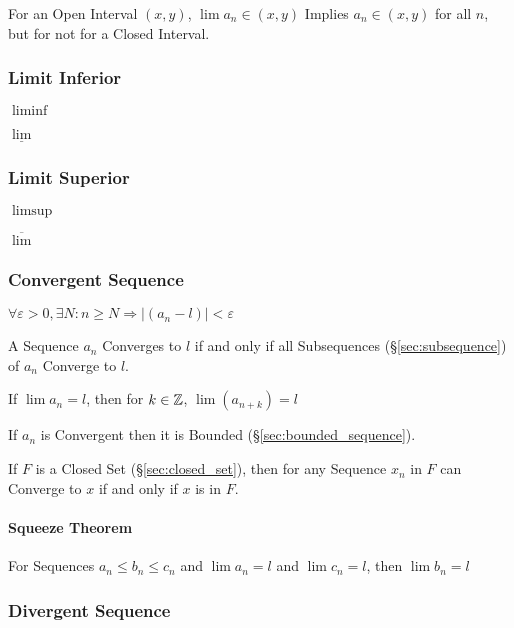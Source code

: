 For an Open Interval $(x,y)$, $\lim a_n \in (x,y)$ Implies $a_n \in
(x,y)$ for all $n$, but for not for a Closed Interval.



\subsubsection{Limit Inferior}\label{sec:liminf}

$\liminf$

$\underline{\lim}$



\subsubsection{Limit Superior}\label{sec:limsup}

$\limsup$

$\overline{\lim}$



\subsubsection{Convergent Sequence}\label{sec:convergent_sequence}

$\forall \varepsilon > 0, \exists N : n \geq N \Rightarrow |(a_n - l)| <
\varepsilon$

A Sequence $a_n$ Converges to $l$ if and only if all Subsequences
(\S\ref{sec:subsequence}) of $a_n$ Converge to $l$.

If $\lim a_n = l$, then for $k \in \mathbb{Z}$, $\lim (a_{n+k}) = l$

If $a_n$ is Convergent then it is Bounded
(\S\ref{sec:bounded_sequence}).

If $F$ is a Closed Set (\S\ref{sec:closed_set}), then for any Sequence
$x_n$ in $F$ can Converge to $x$ if and only if $x$ is in $F$.



\paragraph{Squeeze Theorem}\label{sec:squeeze_theorem}\hfill

For Sequences $a_n \leq b_n \leq c_n$ and $\lim a_n = l$ and $\lim c_n
= l$, then $\lim b_n = l$



\subsubsection{Divergent Sequence}\label{sec:divergent_sequence}




